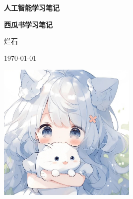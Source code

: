 \documentclass[a4paper,12pt,UTF8,fontset=none]{ctexart}
\begin{document}
\begin{titlepage}
    \centering
    \vspace*{\fill}
    {\LARGE\bfseries 人工智能学习笔记\par}
    \vspace{2cm}
    {\Huge\bfseries 西瓜书学习笔记\par}
    \vspace{2cm}
    {\Large 烂石\par}
    \vspace{1cm}
    {\large \today \par}
    \vspace{4cm}
    \includegraphics[width=0.5\textwidth]{static/images/logo.png}
    \vspace*{\fill}
    \thispagestyle{empty} %
    \newpage
\end{titlepage}


\end{document}
